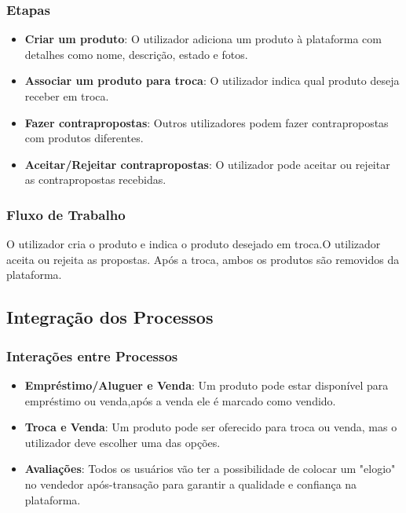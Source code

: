 \documentclass[a4paper, 12pt]{article} %
\begin{document}
\subsubsection{Etapas}
\begin{itemize}
	\item \textbf{Criar um produto}: O utilizador adiciona um produto à plataforma com detalhes como nome, descrição, estado e fotos.
	\item \textbf{Associar um produto para troca}: O utilizador indica qual produto deseja receber em troca.
	\item \textbf{Fazer contrapropostas}: Outros utilizadores podem fazer contrapropostas com produtos diferentes.
	\item \textbf{Aceitar/Rejeitar contrapropostas}: O utilizador pode aceitar ou rejeitar as contrapropostas recebidas.
\end{itemize}

\subsubsection{Fluxo de Trabalho}
O utilizador cria o produto e indica o produto desejado em troca.O utilizador aceita ou rejeita as propostas. Após a troca, ambos os produtos são removidos da plataforma.

\subsection{Integração dos Processos}

\subsubsection{Interações entre Processos}
\begin{itemize}
	\item \textbf{Empréstimo/Aluguer e Venda}: Um produto pode estar disponível para empréstimo ou venda,após a venda ele é marcado como vendido.
	\item \textbf{Troca e Venda}: Um produto pode ser oferecido para troca ou venda, mas o utilizador deve escolher uma das opções.
	\item \textbf{Avaliações}: Todos os usuários vão ter a possibilidade de colocar um "elogio" no vendedor após-transação para garantir a qualidade e confiança na plataforma. 
\end{itemize}
\end{document}
